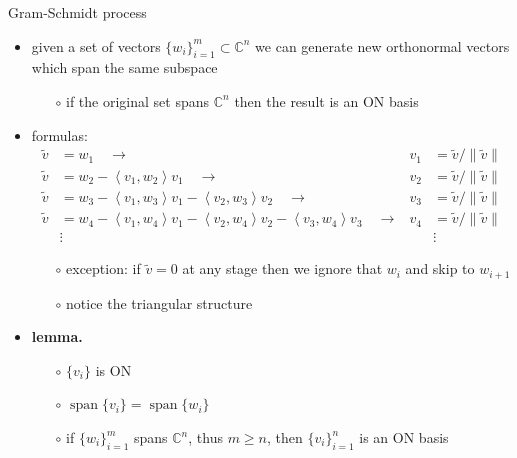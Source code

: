 \documentclass[10pt,hyperref]{beamer}
\newcommand{\CC}{\mathbb{C}}
\newcommand{\ip}[2]{\left<#1,#2\right>}
\begin{document}
\begin{frame}{Gram-Schmidt process}

\label{GSformulas}
\begin{itemize}
\item given a set of vectors $\{w_i\}_{i=1}^m \subset \CC^n$ we can generate new orthonormal vectors which span the same subspace
    \begin{itemize}
    \item[$\circ$] if the original set spans $\CC^n$ then the result is an ON basis
    \end{itemize}
\item formulas:
\begin{align*}
\tilde v &= w_1 \quad \to & v_1 &= \tilde v/\|\tilde v\| \\
\tilde v &= w_2 - \ip{v_1}{w_2} v_1 \quad \to & v_2 &= \tilde v/\|\tilde v\| \\
\tilde v &= w_3 - \ip{v_1}{w_3} v_1 - \ip{v_2}{w_3} v_2 \quad \to & v_3 &= \tilde v/\|\tilde v\| \\
\tilde v &= w_4 - \ip{v_1}{w_4} v_1 - \ip{v_2}{w_4} v_2 - \ip{v_3}{w_4} v_3 \quad \to & v_4 &= \tilde v/\|\tilde v\| \\
&\vdots & &\vdots
\end{align*}
\vspace{-4mm}
    \begin{itemize}
    \item[$\circ$] exception: if $\tilde v=0$ at any stage then we ignore that $w_i$ and skip to $w_{i+1}$
    \item[$\circ$] notice the triangular structure
    \end{itemize}
\item \textbf{lemma.}
    \begin{itemize}
    \item[$\circ$] $\{v_i\}$ is ON
    \item[$\circ$] $\operatorname{span}\{v_i\} = \operatorname{span}\{w_i\}$
    \item[$\circ$] if $\{w_i\}_{i=1}^m$ spans $\CC^n$, thus $m\ge n$, then $\{v_i\}_{i=1}^n$ is an ON basis
    \end{itemize}
\end{itemize}
\end{frame}
\end{document}
